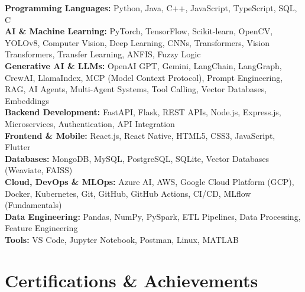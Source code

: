 \documentclass[letterpaper,11pt]{article}
\begin{document}
\begin{itemize}[leftmargin=0.15in, label={}]
\small{\item{

\textbf{Programming Languages:}
Python, Java, C++, JavaScript, TypeScript, SQL, C \\

\textbf{AI \& Machine Learning:}
PyTorch, TensorFlow, Scikit-learn, OpenCV, YOLOv8, Computer Vision, Deep Learning, CNNs, Transformers, Vision Transformers, Transfer Learning, ANFIS, Fuzzy Logic \\

\textbf{Generative AI \& LLMs:}
OpenAI GPT, Gemini, LangChain, LangGraph, CrewAI, LlamaIndex, MCP (Model Context Protocol), Prompt Engineering, RAG, AI Agents, Multi-Agent Systems, Tool Calling, Vector Databases, Embeddings \\

\textbf{Backend Development:}
FastAPI, Flask, REST APIs, Node.js, Express.js, Microservices, Authentication, API Integration \\

\textbf{Frontend \& Mobile:}
React.js, React Native, HTML5, CSS3, JavaScript, Flutter \\

\textbf{Databases:}
MongoDB, MySQL, PostgreSQL, SQLite, Vector Databases (Weaviate, FAISS) \\

\textbf{Cloud, DevOps \& MLOps:}
Azure AI, AWS, Google Cloud Platform (GCP), Docker, Kubernetes, Git, GitHub, GitHub Actions, CI/CD, MLflow (Fundamentals) \\

\textbf{Data Engineering:}
Pandas, NumPy, PySpark, ETL Pipelines, Data Processing, Feature Engineering \\

\textbf{Tools:}
VS Code, Jupyter Notebook, Postman, Linux, MATLAB

}}
\end{itemize}

\vspace{-15pt}

\section{Certifications \& Achievements}
\end{document}

